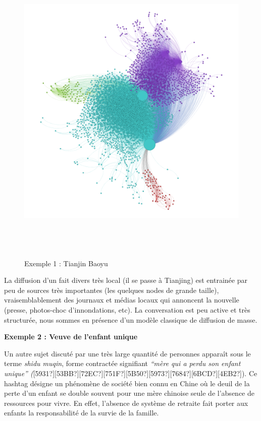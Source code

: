 \begin{figure}[th]
    \centering
    \includegraphics[width=6.0114in,height=6.0114in]{figures/chap3/chapitre3-img17.png}
    \caption{Exemple 1 : Tianjin Baoyu}
\end{figure}

La diffusion d{\textquoteright}un fait divers tr\`es local (il se passe
\`a Tianjing) est entrain\'ee par peu de sources tr\`es importantes
(les quelques nodes de grande taille), vraisemblablement des journaux
et m\'edias locaux qui annoncent la nouvelle (presse, photos-choc
d{\textquoteright}innondations, etc). La conversation est peu active et
tr\`es structur\'ee, nous sommes en pr\'esence d{\textquoteright}un
mod\`ele classique de diffusion de masse.

\textbf{Exemple 2 : Veuve de l{\textquoteright}enfant unique}

Un autre sujet discut\'e par une tr\`es large quantit\'e de personnes
appara\^it sous le terme {\textquotedbl}\textit{shidu
muqin}{\textquotedbl}, forme contract\'ee signifiant
\textit{{\textquotedblleft}m\`ere qui a perdu son enfant
unique{\textquotedblright}
(}[5931?][53BB?][72EC?][751F?][5B50?][5973?][7684?][6BCD?][4EB2?]). Ce
hashtag d\'esigne un ph\'enom\`ene de soci\'et\'e bien connu en Chine
o\`u le deuil de la perte d{\textquoteright}un enfant se double souvent
pour une m\`ere chinoise seule de l{\textquoteright}absence de
ressources pour vivre. En effet, l{\textquoteright}absence de syst\`eme
de retraite fait porter aux enfants la responsabilit\'e de la survie de
la famille. 

